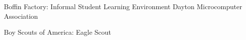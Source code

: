 %
%
%

\begin{scholarship}
	
					{Boffin Factory: Informal Student Learning Environment}
					{Dayton Microcomputer Association}
    

					{Boy Scouts of America: Eagle Scout} 

\end{scholarship}